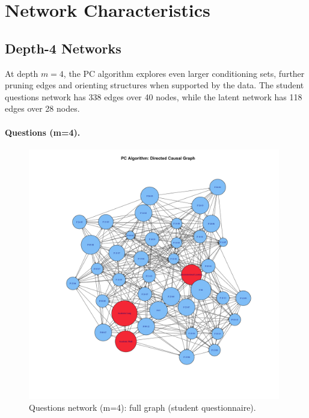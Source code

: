\documentclass[11pt]{article}
\begin{document}
\section{Network Characteristics}

\subsection{Depth-4 Networks}
At depth $m=4$, the PC algorithm explores even larger conditioning sets, further pruning edges and orienting structures when supported by the data. The student questions network has 338 edges over 40 nodes, while the latent network has 118 edges over 28 nodes.

\paragraph{Questions (m=4).}
\begin{figure}[H]
  \centering
  \includegraphics[width=0.98\textwidth]{pc_full_network_estudiante_questions_m4.png}
  \caption{Questions network (m=4): full graph (student questionnaire).}
\end{figure}
\end{document}
